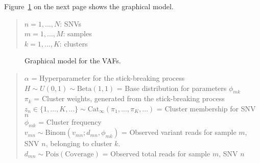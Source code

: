 \documentclass[11pt]{article}
\newcommand{\adjustimg}{%
  \checkoddpage%
  \ifoddpage\hspace*{\dimexpr\evensidemargin-\oddsidemargin}\else\hspace*{-\dimexpr\evensidemargin-\oddsidemargin}\fi%
}
\newcommand{\centerimg}[2][width=\textwidth]{%
  \makebox[\textwidth]{\adjustimg\texttt{[image: \#2]}}%
}
\begin{document}
Figure~\ref{fig:GM} on the next page shows the graphical model.

\newpage
\begin{quote}
$n = 1, \ldots , N$:  SNVs \\
$m = 1, \ldots , M$: samples \\
$k = 1, \ldots ,  K$: clusters
\end{quote}

\begin{figure}[H]
\centerimg[scale=1.0]{multi_pgm.png}
\caption{Graphical model for the VAFs.}
\label{fig:GM}
\end{figure}

\begin{quote}
$\alpha$ = Hyperparameter for the stick-breaking process \\
$H \sim U(0,1) \sim \mathrm{Beta}(1, 1)$ = Base distribution for parameters $\phi_{mk}$	 \\
$\pi_k$ =  Cluster weights, generated from the stick-breaking process \\
$z_{n} \in \{1, \ldots, K, \ldots \}  \sim \mathrm{Cat}_\infty(\pi_1, \ldots, \pi_K, \ldots)$ =  Cluster membership for SNV $n$\\
$\phi_{mk}$ = Cluster frequency \\ 
$v_{mn} \sim \mathrm{Binom}(v_{mn}; d_{mn}, \phi_{mk})$ = {\smaller Observed variant reads for sample $m$, SNV $n$, belonging to cluster $k$.} \\ 
$d_{mn} \sim \mathrm{Pois}(\text{Coverage})$ = Observed total reads for sample $m$, SNV $n$
\end{quote}
\vspace{0.05cm}
\end{document}
